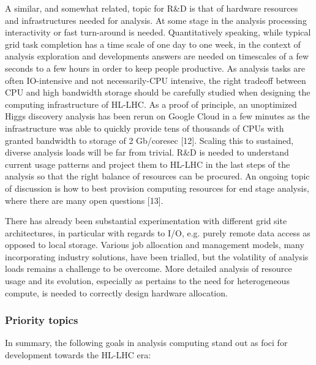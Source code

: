 \documentclass[11pt,a4paper]{article}
\begin{document}
A similar, and somewhat related, topic for R\&D is that of hardware
resources and infrastructures needed for analysis. At some stage in the
analysis processing interactivity or fast turn-around is needed.
Quantitatively speaking, while typical grid task completion has a time
scale of one day to one week, in the context of analysis exploration and
developments answers are needed on timescales of a few seconds to a few
hours in order to keep people productive. As analysis tasks are often
IO-intensive and not necessarily-CPU intensive, the right tradeoff
between CPU and high bandwidth storage should be carefully studied when
designing the computing infrastructure of HL-LHC. As a proof of
principle, an unoptimized Higgs discovery analysis has been rerun on
Google Cloud in a few minutes as the infrastructure was able to quickly
provide tens of thousands of CPUs with granted bandwidth to storage of 2
Gb/coresec {[}12{]}. Scaling this to sustained, diverse analysis loads
will be far from trivial. R\&D is needed to understand current usage
patterns and project them to HL-LHC in the last steps of the analysis so
that the right balance of resources can be procured. An ongoing topic of
discussion is how to best provision computing resources for end stage
analysis, where there are many open questions {[}13{]}.

There has already been substantial experimentation with different grid
site architectures, in particular with regards to I/O, e.g. purely
remote data access as opposed to local storage. Various job allocation
and management models, many incorporating industry solutions, have been
trialled, but the volatility of analysis loads remains a challenge to be
overcome. More detailed analysis of resource usage and its evolution,
especially as pertains to the need for heterogeneous compute, is needed
to correctly design hardware allocation.

\hypertarget{priority-topics}{%
\subsubsection{Priority topics}\label{priority-topics}}

In summary, the following goals in analysis computing stand out as foci
for development towards the HL-LHC era:
\end{document}
